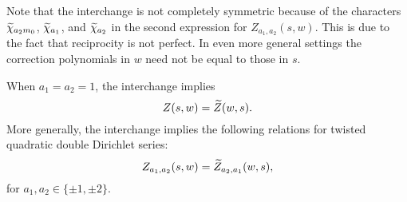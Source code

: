     Note that the interchange is not completely symmetric because of the characters $\widetilde{\chi}_{a_{2}m_{0}}$, $\widetilde{\chi}_{a_{1}}$, and $\widetilde{\chi}_{a_{2}}$ in the second expression for $Z_{a_{1},a_{2}}(s,w)$. This is due to the fact that reciprocity is not perfect. In even more general settings the correction polynomials in $w$ need not be equal to those in $s$.

    \begin{remark}\label{NFrem:symmetry_of_Double_Dirichlet_series}
        When $a_{1} = a_{2} = 1$, the interchange implies
        \[
            Z(s,w) = \widetilde{Z}(w,s).
        \]
        More generally, the interchange implies the following relations for twisted quadratic double Dirichlet series:
        \[
            Z_{a_{1},a_{2}}(s,w) = \widetilde{Z}_{a_{2},a_{1}}(w,s),
        \]
        for $a_{1},a_{2} \in \{\pm1,\pm2\}$.
    \end{remark}

